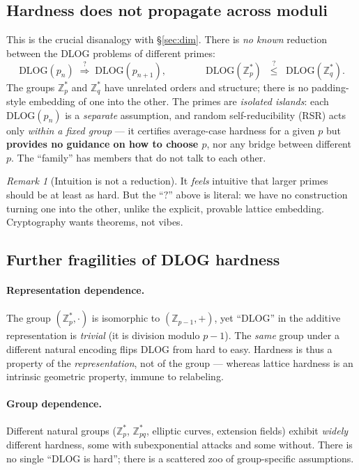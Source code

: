 \documentclass[11pt]{article}
\theoremstyle{definition}
\theoremstyle{plain}
\theoremstyle{remark}
\newtheorem{remark}[definition]{Remark}
\newcommand{\Z}{\mathbb{Z}}
\newcommand{\dlog}{\mathrm{DLOG}}
\newcommand{\reduces}{\;\leq\;}
\begin{document}
\subsection{Hardness does not propagate across moduli}

This is the crucial disanalogy with \S\ref{sec:dim}. There is \emph{no known} reduction
between the DLOG problems of different primes:
\[
   \dlog(p_n) \;\overset{?}{\Longrightarrow}\; \dlog(p_{n+1}),
   \qquad\qquad
   \dlog(\Z_p^*) \;\overset{?}{\reduces}\; \dlog(\Z_q^*).
\]
The groups $\Z_{p}^*$ and $\Z_{q}^*$ have unrelated orders and structure; there is no
padding-style embedding of one into the other. The primes are \emph{isolated islands}: each
$\dlog(p_n)$ is a \emph{separate} assumption, and random self-reducibility
(RSR) acts only \emph{within a fixed group} --- it certifies average-case hardness for a
given $p$ but \textbf{provides no guidance on how to choose $p$}, nor any bridge between
different $p$. The ``family'' has members that do not talk to each other.

\begin{remark}[Intuition is not a reduction]
It \emph{feels} intuitive that larger primes should be at least as hard. But the ``$?$''
above is literal: we have no construction turning one into the other, unlike the explicit,
provable lattice embedding. Cryptography wants theorems, not vibes.
\end{remark}

\subsection{Further fragilities of DLOG hardness}

\paragraph{Representation dependence.}
The group $(\Z_p^*,\cdot)$ is isomorphic to $(\Z_{p-1},+)$, yet ``DLOG'' in the additive
representation is \emph{trivial} (it is division modulo $p-1$). The \emph{same} group under a
different natural encoding flips DLOG from hard to easy. Hardness is thus a property of the
\emph{representation}, not of the group --- whereas lattice hardness is an intrinsic
geometric property, immune to relabeling.

\paragraph{Group dependence.}
Different natural groups ($\Z_p^*$, $\Z_{pq}^*$, elliptic curves, extension fields) exhibit
\emph{widely} different hardness, some with subexponential attacks and some without. There is
no single ``DLOG is hard''; there is a scattered zoo of group-specific assumptions.
\end{document}

